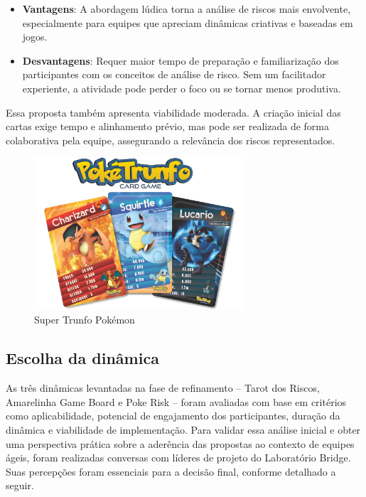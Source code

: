 \documentclass[
	12pt,
	openright,
	twoside,
	a4paper,
	english,
	brazil
	]{abntex2}
\begin{document}
\begin{itemize}
  \item \textbf{Vantagens}: A abordagem lúdica torna a análise de riscos mais envolvente, especialmente para equipes que apreciam dinâmicas criativas e baseadas em jogos. 
  \item \textbf{Desvantagens}: Requer maior tempo de preparação e familiarização dos participantes com os conceitos de análise de risco. Sem um facilitador experiente, a atividade pode perder o foco ou se tornar menos produtiva. 
\end{itemize}

Essa proposta também apresenta viabilidade moderada. A criação inicial das cartas exige tempo e alinhamento prévio, mas pode ser realizada de forma colaborativa pela equipe, assegurando a relevância dos riscos representados.

\begin{figure}[H]
  \centering
  \caption{\label{super-trunfo}Super Trunfo Pokémon}
  \includegraphics[width=0.7\textwidth]{super-trunfo}
\end{figure}

\subsection{Escolha da dinâmica}
\label{sec:escolha-dinamica}

As três dinâmicas levantadas na fase de refinamento -- Tarot dos Riscos, Amarelinha Game Board e Poke Risk -- foram avaliadas com base em critérios como aplicabilidade, potencial de engajamento dos participantes, duração da dinâmica e viabilidade de implementação. Para validar essa análise inicial e obter uma perspectiva prática sobre a aderência das propostas ao contexto de equipes ágeis, foram realizadas conversas com líderes de projeto do Laboratório Bridge. Suas percepções foram essenciais para a decisão final, conforme detalhado a seguir.
\end{document}

